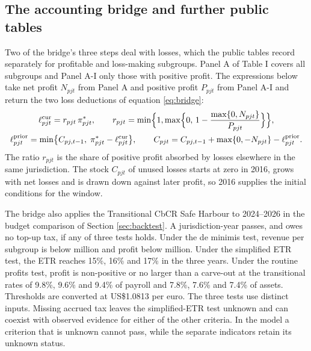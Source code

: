 \documentclass[11pt,a4paper]{article}
\newcommand{\EUR}{\texteuro}
\newcommand{\usd}{US\$}
\begin{document}
\subsection{The accounting bridge and further public tables}\label{app:cbcr_extensions}

Two of the bridge's three steps deal with losses, which the public tables record separately for profitable and loss-making subgroups. Panel A of Table I covers all subgroups and Panel A-I only those with positive profit. The expressions below take net profit $N_{pjt}$ from Panel A and positive profit $P_{pjt}$ from Panel A-I and return the two loss deductions of equation \eqref{eq:bridge}:
\begin{gather}
\ell^{\mathrm{cur}}_{pjt}=r_{pjt}\,\pi^{*}_{pjt},\qquad r_{pjt}=\min\Bigl\{1,\max\Bigl\{0,\,1-\frac{\max\{0,N_{pjt}\}}{P_{pjt}}\Bigr\}\Bigr\},\label{eq:app_lcur}\\
\ell^{\mathrm{prior}}_{pjt}=\min\bigl\{C_{pj,t-1},\;\pi^{*}_{pjt}-\ell^{\mathrm{cur}}_{pjt}\bigr\},\qquad
C_{pjt}=C_{pj,t-1}+\max\{0,-N_{pjt}\}-\ell^{\mathrm{prior}}_{pjt}.\label{eq:app_lprior}
\end{gather}
The ratio $r_{pjt}$ is the share of positive profit absorbed by losses elsewhere in the same jurisdiction. The stock $C_{pjt}$ of unused losses starts at zero in 2016, grows with net losses and is drawn down against later profit, so 2016 supplies the initial conditions for the window.

The bridge also applies the Transitional CbCR Safe Harbour to 2024–2026 in the budget comparison of Section \ref{sec:backtest}. A jurisdiction-year passes, and owes no top-up tax, if any of three tests holds. Under the de minimis test, revenue per subgroup is below \EUR10 million and profit below \EUR1 million. Under the simplified ETR test, the ETR reaches 15\%, 16\% and 17\% in the three years. Under the routine profits test, profit is non-positive or no larger than a carve-out at the transitional rates of 9.8\%, 9.6\% and 9.4\% of payroll and 7.8\%, 7.6\% and 7.4\% of assets. Thresholds are converted at \usd1.0813 per euro. The three tests use distinct inputs. Missing accrued tax leaves the simplified-ETR test unknown and can coexist with observed evidence for either of the other criteria. In the model a criterion that is unknown cannot pass, while the separate indicators retain its unknown status.


\end{document}
